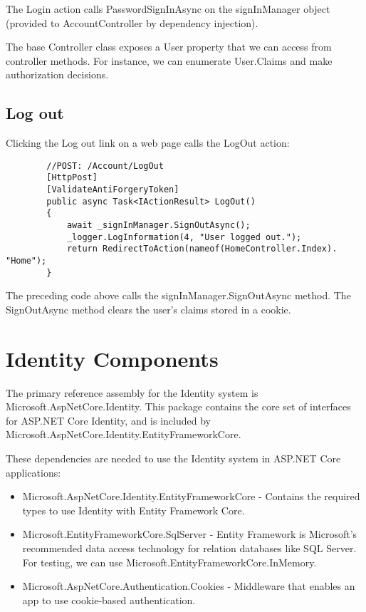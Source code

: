 \documentclass{report}
\begin{document}
    The Login action calls PasswordSignInAsync on the signInManager object
    (provided to AccountController by dependency injection).

    The base Controller class exposes a User property that we can access from
    controller methods. For instance, we can enumerate User.Claims and make
    authorization decisions.

    \subsection{Log out}
    Clicking the Log out link on a web page calls the LogOut action:
    \lstset{style=sharpc}
    \begin{lstlisting}
        //POST: /Account/LogOut
        [HttpPost]
        [ValidateAntiForgeryToken]
        public async Task<IActionResult> LogOut()
        {
            await _signInManager.SignOutAsync();
            _logger.LogInformation(4, "User logged out.");
            return RedirectToAction(nameof(HomeController.Index). "Home");
        }
    \end{lstlisting}

    The preceding code above calls the signInManager.SignOutAsync method. The SignOutAsync method clears the user's claims stored in a cookie.

    \section{Identity Components}
    The primary reference assembly for the Identity system is Microsoft.AspNetCore.Identity. This package contains the core set of interfaces for ASP.NET Core Identity, and is included by Microsoft.AspNetCore.Identity.EntityFrameworkCore.

    These dependencies are needed to use the Identity system in ASP.NET Core applications:
    \begin{itemize}
        \item Microsoft.AspNetCore.Identity.EntityFrameworkCore - Contains the required types to use Identity with Entity Framework Core.
        \item Microsoft.EntityFrameworkCore.SqlServer - Entity Framework is Microsoft's recommended data access technology for relation databases like SQL Server. For testing, we can use Microsoft.EntityFrameworkCore.InMemory.
        \item Microsoft.AspNetCore.Authentication.Cookies - Middleware that enables an app to use cookie-based authentication.
    \end{itemize}
\end{document}

